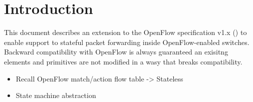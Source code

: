 
\chapter{Introduction}


This document describes an extension to the OpenFlow specification v1.x () to enable support to stateful packet forwarding inside OpenFlow-enabled switches. Backward compatibility with OpenFlow is always guaranteed an exisitng elements and primitives are not modified in a wasy that breaks compatibility.

\begin{itemize}
	\item Recall OpenFlow match/action flow table -> Stateless
	\item State machine abstraction
\end{itemize}


